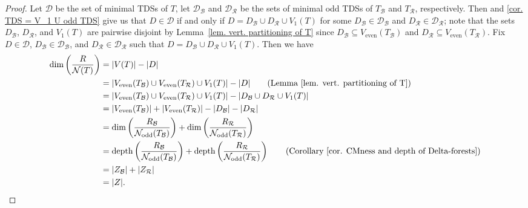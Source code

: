 \documentclass[12pt, reqno]{amsart}
\theoremstyle{definition}
\theoremstyle{plain}
\theoremstyle{definition}
\newcommand{\depth}{\mbox{depth}}
\newcommand{\R}{\mathcal{R}}
\newcommand{\B}{\mathcal{B}}
\newcommand{\NN}{\mathcal{N}}
\begin{document}
\begin{proof}
    Let $\mathcal{D}$ be the set of minimal TDSs of $T$, let $\mathcal{D}_\B$ and $\mathcal{D}_\R$ be the sets of minimal odd TDSs of $T_\B$ and $T_\R$, respectively.
    Then \cite[Corollary 2.9]{COURAGE_GT} and \ref{cor. TDS = V_1 U odd TDS} give us that $D \in \mathcal{D}$ if and only if $D = D_\B \cup D_\R \cup V_1(T)$ for some $D_\B \in \mathcal{D}_\B$ and $D_\R \in \mathcal{D}_\R$; note that the sets $D_\B$, $D_\R$, and $V_1(T)$ are pairwise disjoint by Lemma~\ref{lem. vert. partitioning of T} since $D_\B \subseteq V_{\text{even}}(T_\B)$ and $D_\R \subseteq V_{\text{even}}(T_\R)$.
    Fix $D \in \mathcal{D}$, $D_\B \in \mathcal{D}_\B$, and $D_\R \in \mathcal{D}_\R$ such that $D = D_\B \cup D_\R \cup V_1(T)$.
    Then we have
    \begin{align*}
        \dim\left(\frac{R}{\NN(T)} \right) &= |V(T)| - |D|\\
        &= |V_{\text{even}}(T_\B) \cup V_{\text{even}}(T_\R) \cup V_1(T)| - |D| \tag{Lemma~\ref{lem. vert. partitioning of T}}\\
        &= |V_{\text{even}}(T_\B) \cup V_{\text{even}}(T_\R) \cup V_1(T)| - |D_\B \cup D_\R \cup V_1(T)|\\
        &= |V_{\text{even}}(T_\B)| + |V_{\text{even}}(T_\R)| - |D_\B| - |D_\R| \\
        &= \dim\left(\frac{R_\B}{\NN_{\text{odd}}(T_\B)}\right) + \dim\left(\frac{R_\R}{\NN_{\text{odd}}(T_\R)}\right)\\
        &= \depth\left(\frac{R_\B}{\NN_{\text{odd}}(T_\B)} \right) + \depth\left(\frac{R_\R}{\NN_{\text{odd}}(T_\R)} \right) \tag{Corollary~\ref{cor. CMness and depth of Delta-forests}}\\
        &= |Z_\B| + |Z_\R|\\
        &= |Z|.
    \end{align*}
    

\end{proof}
\end{document}
